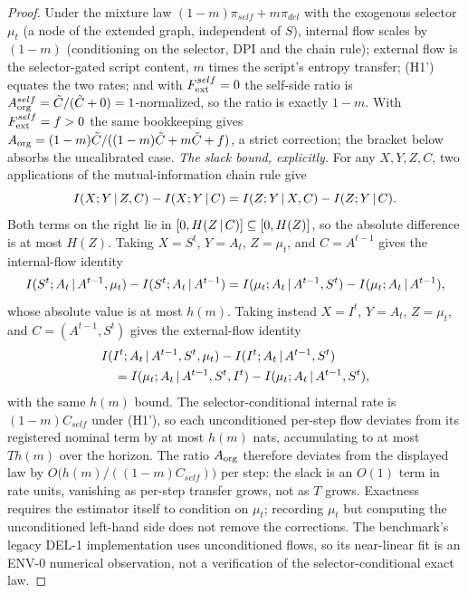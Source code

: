 \begin{proof}
Under the mixture law $(1-m)\pi_{self}+m\pi_{del}$ with the exogenous
selector $\mu_t$ (a node of the extended graph, independent of $S$), internal
flow scales by $(1-m)$ (conditioning on the selector, DPI and the chain
rule); external flow is the selector-gated script content, $m$ times the
script's entropy transfer; (H1') equates the two rates; and with
$F_{\mathrm{ext}}^{self}=0$ the self-side ratio is $A_{\mathrm{org}}^{self}=\tilde
C/(\tilde C+0)=1$-normalized, so the ratio is exactly $1-m$. With
$F_{\mathrm{ext}}^{self}=f>0$ the same bookkeeping gives
$A_{\mathrm{org}}=(1-m)\tilde C/((1-m)\tilde C+m\tilde C+f)$, a strict correction; the
bracket below absorbs the uncalibrated case.
\emph{The slack bound, explicitly.} For any $X,Y,Z,C$, two applications of
the mutual-information chain rule give
\begin{equation}\label{eq:selector-chain}
I(X;Y\,|\, Z,C)-I(X;Y\,|\, C)
=I(Z;Y\,|\, X,C)-I(Z;Y\,|\, C).
\end{equation}
Both terms on the right lie in $[0,H(Z\,|\, C)]\subseteq[0,H(Z)]$, so the
absolute difference is at most $H(Z)$. Taking $X=S^t$, $Y=A_t$, $Z=\mu_t$,
and $C=A^{t-1}$ gives the internal-flow identity
\[
I(S^t;A_t\,|\, A^{t-1},\mu_t)-I(S^t;A_t\,|\, A^{t-1})
=I(\mu_t;A_t\,|\, A^{t-1},S^t)-I(\mu_t;A_t\,|\, A^{t-1}),
\]
whose absolute value is at most $h(m)$. Taking instead $X=I^t$, $Y=A_t$,
$Z=\mu_t$, and $C=(A^{t-1},S^t)$ gives the external-flow identity
\[
\begin{aligned}
&I(I^t;A_t\,|\, A^{t-1},S^t,\mu_t)-I(I^t;A_t\,|\, A^{t-1},S^t)\\
&\quad=I(\mu_t;A_t\,|\, A^{t-1},S^t,I^t)
-I(\mu_t;A_t\,|\, A^{t-1},S^t),
\end{aligned}
\]
with the same $h(m)$ bound. The selector-conditional internal rate is
$(1-m)C_{self}$ under (H1'), so each unconditioned per-step flow deviates
from its registered nominal term by at most $h(m)$ nats, accumulating to at
most $T h(m)$ over the horizon. The ratio $A_{\mathrm{org}}$ therefore deviates from
the displayed law by $O\bigl(h(m)/((1-m)C_{self})\bigr)$ per step: the
slack is an $O(1)$ term in rate units, vanishing as per-step transfer grows,
not as $T$ grows. Exactness requires the estimator itself to condition on
$\mu_t$; recording $\mu_t$ but computing the unconditioned left-hand side
does not remove the corrections. The benchmark's legacy DEL-1 implementation
uses unconditioned flows, so its near-linear fit is an ENV-0 numerical
observation, not a verification of the selector-conditional exact law.
\end{proof}

